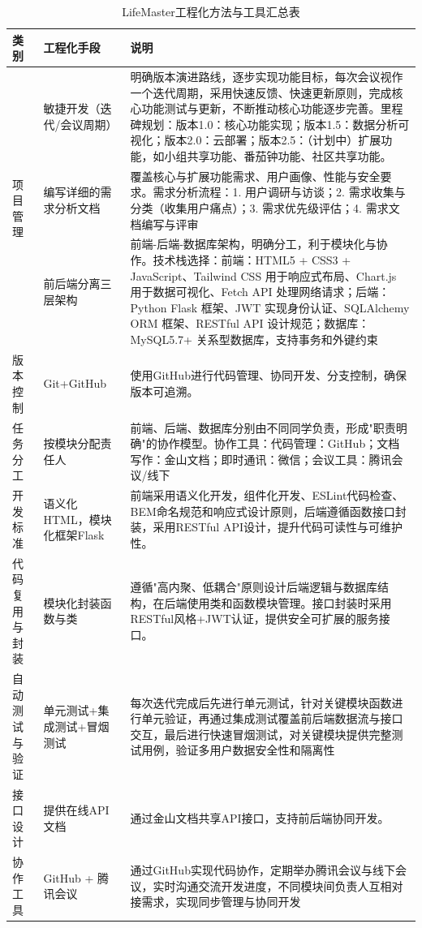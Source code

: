 \documentclass[a4paper]{article}
\begin{document}
\begin{table}[H]
\centering
\caption{LifeMaster工程化方法与工具汇总表}
\begin{tabularx}{\textwidth}{|l|l|X|}
\hline
\textbf{类别} & \textbf{工程化手段} & \textbf{说明} \\
\hline
\multirow{3}{*}{项目管理} & 敏捷开发（迭代/会议周期） & 明确版本演进路线，逐步实现功能目标，每次会议视作一个迭代周期，采用快速反馈、快速更新原则，完成核心功能测试与更新，不断推动核心功能逐步完善。里程碑规划：版本1.0：核心功能实现；版本1.5：数据分析可视化；版本2.0：云部署；版本2.5：（计划中）扩展功能，如小组共享功能、番茄钟功能、社区共享功能。 \\
\hline
需求管理 & 编写详细的需求分析文档 & 覆盖核心与扩展功能需求、用户画像、性能与安全要求。需求分析流程：1. 用户调研与访谈；2. 需求收集与分类（收集用户痛点）；3. 需求优先级评估；4. 需求文档编写与评审 \\
\hline
\multirow{4}{*}{架构设计} & 前后端分离三层架构 & 前端-后端-数据库架构，明确分工，利于模块化与协作。技术栈选择：前端：HTML5 + CSS3 + JavaScript、Tailwind CSS 用于响应式布局、Chart.js 用于数据可视化、Fetch API 处理网络请求；后端：Python Flask 框架、JWT 实现身份认证、SQLAlchemy ORM 框架、RESTful API 设计规范；数据库：MySQL5.7+ 关系型数据库，支持事务和外键约束 \\
\hline
版本控制 & Git+GitHub & 使用GitHub进行代码管理、协同开发、分支控制，确保版本可追溯。 \\
\hline
任务分工 & 按模块分配责任人 & 前端、后端、数据库分别由不同同学负责，形成"职责明确"的协作模型。协作工具：代码管理：GitHub；文档写作：金山文档；即时通讯：微信；会议工具：腾讯会议/线下 \\
\hline
开发标准 & 语义化HTML，模块化框架Flask & 前端采用语义化开发，组件化开发、ESLint代码检查、BEM命名规范和响应式设计原则，后端遵循函数接口封装，采用RESTful API设计，提升代码可读性与可维护性。 \\
\hline
代码复用与封装 & 模块化封装函数与类 & 遵循"高内聚、低耦合"原则设计后端逻辑与数据库结构，在后端使用类和函数模块管理。接口封装时采用RESTful风格+JWT认证，提供安全可扩展的服务接口。 \\
\hline
自动测试与验证 & 单元测试+集成测试+冒烟测试 & 每次迭代完成后先进行单元测试，针对关键模块函数进行单元验证，再通过集成测试覆盖前后端数据流与接口交互，最后进行快速冒烟测试，对关键模块提供完整测试用例，验证多用户数据安全性和隔离性 \\
\hline
接口设计 & 提供在线API文档 & 通过金山文档共享API接口，支持前后端协同开发。 \\
\hline
协作工具 & GitHub + 腾讯会议 & 通过GitHub实现代码协作，定期举办腾讯会议与线下会议，实时沟通交流开发进度，不同模块间负责人互相对接需求，实现同步管理与协同开发 \\
\hline
\end{tabularx}
\end{table}
\end{document}
